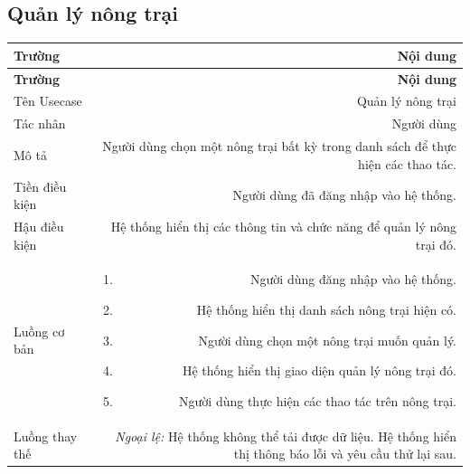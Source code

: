 \subsection{Quản lý nông trại}
 
\begin{longtable}{|L|R|}
 
\hline
\textbf{Trường} & \textbf{Nội dung} \\ \hline
 
\endfirsthead
 
\hline
\textbf{Trường} & \textbf{Nội dung} \\ \hline
 
\endhead
 
\endfoot
 
Tên Usecase & Quản lý nông trại \\[4pt] \hline
 
Tác nhân & Người dùng \\[4pt] \hline
 
Mô tả & Người dùng chọn một nông trại bất kỳ trong danh sách để thực hiện các thao tác. \\[4pt] \hline
 
Tiền điều kiện & Người dùng đã đăng nhập vào hệ thống. \\[4pt] \hline
 
Hậu điều kiện & Hệ thống hiển thị các thông tin và chức năng để quản lý nông trại đó. \\[4pt] \hline
 
Luồng cơ bản &
\begin{enumerate}[leftmargin=*, nosep, topsep=2pt]
  \item Người dùng đăng nhập vào hệ thống.
  \item Hệ thống hiển thị danh sách nông trại hiện có.
  \item Người dùng chọn một nông trại muốn quản lý.
  \item Hệ thống hiển thị giao diện quản lý nông trại đó.
  \item Người dùng thực hiện các thao tác trên nông trại.
\end{enumerate} \\[4pt] \hline
 
Luồng thay thế &
\textit{Ngoại lệ:} Hệ thống không thể tải được dữ liệu.
Hệ thống hiển thị thông báo lỗi và yêu cầu thử lại sau. \\[4pt] \hline
 
\end{longtable}
 
